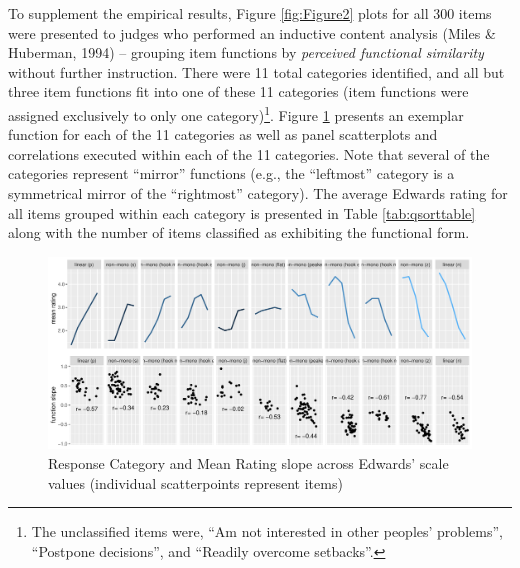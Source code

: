 \documentclass[
  ,jou]{apa6}
\begin{document}
To supplement the empirical results, Figure \ref{fig:Figure2} plots for all 300 items were presented to judges who performed an inductive content analysis (Miles \& Huberman, 1994) -- grouping item functions by \emph{perceived functional similarity} without further instruction. There were 11 total categories identified, and all but three item functions fit into one of these 11 categories (item functions were assigned exclusively to only one category)\footnote{The unclassified items were, ``Am not interested in other peoples' problems'', ``Postpone decisions'', and ``Readily overcome setbacks''.}. Figure \ref{fig:lastone} presents an exemplar function for each of the 11 categories as well as panel scatterplots and correlations executed within each of the 11 categories. Note that several of the categories represent ``mirror'' functions (e.g., the ``leftmost'' category is a symmetrical mirror of the ``rightmost'' category). The average Edwards rating for all items grouped within each category is presented in Table \ref{tab:qsorttable} along with the number of items classified as exhibiting the functional form.

\begin{figure}
\centering
\includegraphics{FullStudy_files/figure-latex/lastone-1.pdf}
\caption{\label{fig:lastone}Response Category and Mean Rating slope across Edwards' scale values (individual scatterpoints represent items)}
\end{figure}
\end{document}
